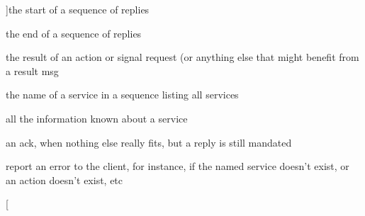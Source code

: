 \begin{Desc}
\begin{description}
{}]the start of a sequence of replies \item[{\em 
UPK\_\-REPL\_\-SEQ\_\-END\label{group__client__protocol_gab04f5fc5314f6296f0ef4b171d1b4282a08f5de1191d69da4a59758eeef26bac2}
}]the end of a sequence of replies \item[{\em 
UPK\_\-REPL\_\-RESULT\label{group__client__protocol_gab04f5fc5314f6296f0ef4b171d1b4282a553cb105e6ff4b627e2799cfc3f8f74c}
}]the result of an action or signal request (or anything else that might benefit from a result msg \item[{\em 
UPK\_\-REPL\_\-LISTING\label{group__client__protocol_gab04f5fc5314f6296f0ef4b171d1b4282ac158a8306626930b47ef905a7830e07f}
}]the name of a service in a sequence listing all services \item[{\em 
UPK\_\-REPL\_\-SVCINFO\label{group__client__protocol_gab04f5fc5314f6296f0ef4b171d1b4282ae1add19bc555a5ce4badb159f98e0e37}
}]all the information known about a service \item[{\em 
UPK\_\-REPL\_\-ACK\label{group__client__protocol_gab04f5fc5314f6296f0ef4b171d1b4282acbf1523c6bf5cc236d060d6d0ba7db2d}
}]an ack, when nothing else really fits, but a reply is still mandated \item[{\em 
UPK\_\-REPL\_\-ERROR\label{group__client__protocol_gab04f5fc5314f6296f0ef4b171d1b4282aa041df31800d879a09a3ce477e222c6d}
}]report an error to the client, for instance, if the named service doesn't exist, or an action doesn't exist, etc \item[{\em 
}
\end{description}
\end{Desc}
